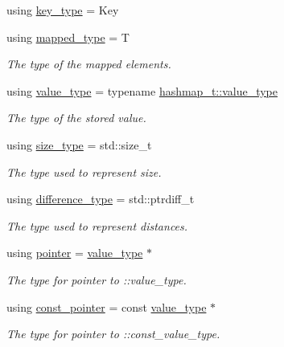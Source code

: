 \begin{DoxyCompactItemize}
\item 
using \hyperlink{group__Types_gac2a5bb16d47a5da2d493616e6fa5a73c}{key\-\_\-type} = Key
\item 
using \hyperlink{group__Types_ga146f53b5d4191c21deed1bd89683d4bf}{mapped\-\_\-type} = T
\begin{DoxyCompactList}\small\item\em The type of the mapped elements. \end{DoxyCompactList}\item 
using \hyperlink{group__Types_ga930e4848d41a2efe4d2e47f52650a76c}{value\-\_\-type} = typename \hyperlink{classshad_1_1Hashmap_ad8c0108347b59bcd19ccb8070a313dd8}{hashmap\-\_\-t\-::value\-\_\-type}
\begin{DoxyCompactList}\small\item\em The type of the stored value. \end{DoxyCompactList}\item 
using \hyperlink{group__Types_ga2a84980e6d435a8a7b1a99f78b828a65}{size\-\_\-type} = std\-::size\-\_\-t
\begin{DoxyCompactList}\small\item\em The type used to represent size. \end{DoxyCompactList}\item 
using \hyperlink{group__Types_ga2a1294efcd043aa4bbb5da7c3c811448}{difference\-\_\-type} = std\-::ptrdiff\-\_\-t
\begin{DoxyCompactList}\small\item\em The type used to represent distances. \end{DoxyCompactList}\item 
using \hyperlink{group__Types_ga94466a187a2da262cb5b58356c3ac24c}{pointer} = \hyperlink{group__Types_ga930e4848d41a2efe4d2e47f52650a76c}{value\-\_\-type} $\ast$
\begin{DoxyCompactList}\small\item\em The type for pointer to \-::value\-\_\-type. \end{DoxyCompactList}\item 
using \hyperlink{group__Types_ga4db9d56c27ddb72ccad61249ef55c54c}{const\-\_\-pointer} = const \hyperlink{group__Types_ga930e4848d41a2efe4d2e47f52650a76c}{value\-\_\-type} $\ast$
\begin{DoxyCompactList}\small\item\em The type for pointer to \-::const\-\_\-value\-\_\-type. \end{DoxyCompactList}\item 

\end{DoxyCompactItemize}
